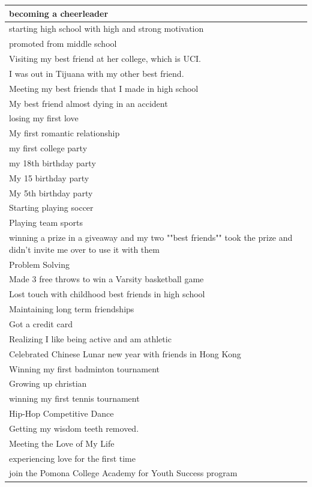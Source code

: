 \documentclass[
  .7em,
  letterpaper,
  DIV=11,
  numbers=noendperiod]{scrartcl}
\begin{document}
\begin{table}
\begin{tabular}{l}
\hline
becoming a cheerleader\\
\hline
starting high school with high and strong motivation\\
\hline
promoted from middle school\\
\hline
Visiting my best friend at her college, which is UCI.\\
\hline
I was out in Tijuana with my other best friend.\\
\hline
Meeting my best friends that I made in high school\\
\hline
My best friend almost dying in an accident\\
\hline
losing my first love\\
\hline
My first romantic relationship\\
\hline
my first college party\\
\hline
my 18th birthday party\\
\hline
My 15 birthday party\\
\hline
My 5th birthday party\\
\hline
Starting playing soccer\\
\hline
Playing team sports\\
\hline
winning a prize in a giveaway and my two ""best friends"" took the prize and didn't invite me over to use it with them\\
\hline
Problem Solving\\
\hline
Made 3 free throws to win a Varsity basketball game\\
\hline
Lost touch with childhood best friends in high school\\
\hline
Maintaining long term friendships\\
\hline
Got a credit card\\
\hline
Realizing I like being active and am athletic\\
\hline
Celebrated Chinese Lunar new year with friends in Hong Kong\\
\hline
Winning my first badminton tournament\\
\hline
Growing up christian\\
\hline
winning my first tennis tournament\\
\hline
Hip-Hop Competitive Dance\\
\hline
Getting my wisdom teeth removed.\\
\hline
Meeting the Love of My Life\\
\hline
experiencing love for the first time\\
\hline
join the Pomona College Academy for Youth Success program\\

\end{tabular}
\end{table}
\end{document}
